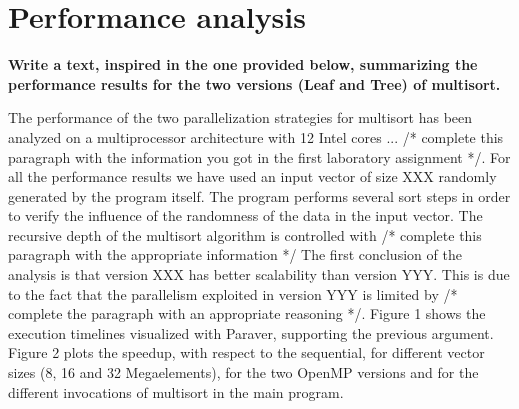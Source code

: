 \documentclass[a4paper,11pt]{article}
\begin{document}
\section{Performance analysis}
\textbf{Write a text, inspired in the one provided below, summarizing
  the performance results for the two versions (Leaf and Tree) of
  multisort.}

The performance of the two parallelization strategies for multisort
has been analyzed on a multiprocessor architecture with 12 Intel
cores ... /* complete this paragraph with the information you got in
the first laboratory assignment */.  For all the performance results we
have used an input vector of size XXX randomly generated by the
program itself. The program performs several sort steps in order to
verify the influence of the randomness of the data in the input
vector. The recursive depth of the multisort algorithm is controlled
with /* complete this paragraph with the appropriate information */
The first conclusion of the analysis is that version XXX has better
scalability than version YYY. This is due to the fact that the
parallelism exploited in version YYY is limited by /* complete the
paragraph with an appropriate reasoning */. Figure 1 shows the
execution timelines visualized with Paraver, supporting the previous
argument.  Figure 2 plots the speedup, with respect to the sequential,
for different vector sizes (8, 16 and 32 Megaelements), for the two
OpenMP versions and for the different invocations of multisort in the
main program.
\end{document}
